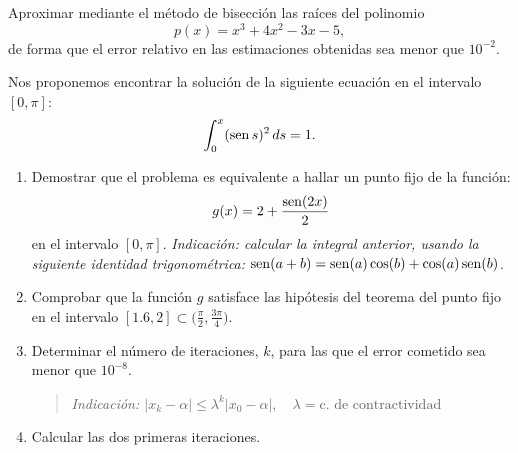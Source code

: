 \begin{EjerciciosPropuestos}
  \begin{problema}
    Aproximar mediante el método de bisección las raíces del polinomio
    $$
    p(x) = x^3 + 4x^2 -3x -5,
    $$
    de forma que el error relativo en las estimaciones obtenidas sea
    menor que $10^{-2}$.
  \end{problema}
  \begin{problema}
    Nos proponemos encontrar la solución de la siguiente ecuación en
    el intervalo $[0,\pi]$:
    $$
    \int_0^x (\operatorname{sen} s)^2 \, ds = 1.
    $$

    \begin{enumerate}
    \item Demostrar que el problema es equivalente a hallar un punto
      fijo de la función:
      $$
      g(x)=2 + \frac{\operatorname{sen}(2x)}{2}
      $$
      en el intervalo $[0,\pi]$. \textit{Indicación: calcular la integral
      anterior, usando la siguiente identidad trigonométrica:
      $\operatorname{sen}(a+b)=\operatorname{sen}(a)\cos(b)+\cos(a)\operatorname{sen}(b)$}.
    \item Comprobar que la función $g$ satisface las hipótesis del
      teorema del punto fijo en el intervalo $\displaystyle [1.6,2]\subset
      \bigg(\frac{\pi}{2},\frac{3\pi}{4}\bigg)$.
    \item Determinar el número de iteraciones, $k$, para las que el
      error cometido sea menor que $10^{-8}$.
      \begin{quote}\em\small
        Indicación:
        $|x_k-\alpha|\le \lambda^k|x_0-\alpha|,
        \quad\lambda=\text{c. de contractividad}$
      \end{quote}
    \item Calcular las dos primeras iteraciones.
    \end{enumerate}
  \end{problema}



\end{EjerciciosPropuestos}
